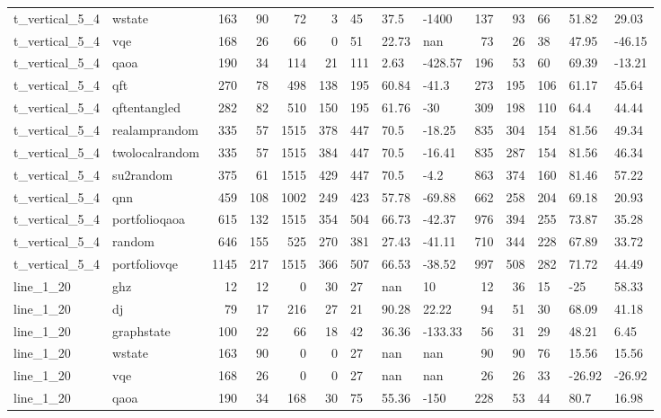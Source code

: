 \begin{longtable}{llrrrrlllrrlll}
t\_vertical\_5\_4 & wstate & 163 & 90 & 72 & 3 & 45 & 37.5 & -1400 & 137 & 93 & 66 & 51.82 & 29.03 \\
t\_vertical\_5\_4 & vqe & 168 & 26 & 66 & 0 & 51 & 22.73 & nan & 73 & 26 & 38 & 47.95 & -46.15 \\
t\_vertical\_5\_4 & qaoa & 190 & 34 & 114 & 21 & 111 & 2.63 & -428.57 & 196 & 53 & 60 & 69.39 & -13.21 \\
t\_vertical\_5\_4 & qft & 270 & 78 & 498 & 138 & 195 & 60.84 & -41.3 & 273 & 195 & 106 & 61.17 & 45.64 \\
t\_vertical\_5\_4 & qftentangled & 282 & 82 & 510 & 150 & 195 & 61.76 & -30 & 309 & 198 & 110 & 64.4 & 44.44 \\
t\_vertical\_5\_4 & realamprandom & 335 & 57 & 1515 & 378 & 447 & 70.5 & -18.25 & 835 & 304 & 154 & 81.56 & 49.34 \\
t\_vertical\_5\_4 & twolocalrandom & 335 & 57 & 1515 & 384 & 447 & 70.5 & -16.41 & 835 & 287 & 154 & 81.56 & 46.34 \\
t\_vertical\_5\_4 & su2random & 375 & 61 & 1515 & 429 & 447 & 70.5 & -4.2 & 863 & 374 & 160 & 81.46 & 57.22 \\
t\_vertical\_5\_4 & qnn & 459 & 108 & 1002 & 249 & 423 & 57.78 & -69.88 & 662 & 258 & 204 & 69.18 & 20.93 \\
t\_vertical\_5\_4 & portfolioqaoa & 615 & 132 & 1515 & 354 & 504 & 66.73 & -42.37 & 976 & 394 & 255 & 73.87 & 35.28 \\
t\_vertical\_5\_4 & random & 646 & 155 & 525 & 270 & 381 & 27.43 & -41.11 & 710 & 344 & 228 & 67.89 & 33.72 \\
t\_vertical\_5\_4 & portfoliovqe & 1145 & 217 & 1515 & 366 & 507 & 66.53 & -38.52 & 997 & 508 & 282 & 71.72 & 44.49 \\
line\_1\_20 & ghz & 12 & 12 & 0 & 30 & 27 & nan & 10 & 12 & 36 & 15 & -25 & 58.33 \\
line\_1\_20 & dj & 79 & 17 & 216 & 27 & 21 & 90.28 & 22.22 & 94 & 51 & 30 & 68.09 & 41.18 \\
line\_1\_20 & graphstate & 100 & 22 & 66 & 18 & 42 & 36.36 & -133.33 & 56 & 31 & 29 & 48.21 & 6.45 \\
line\_1\_20 & wstate & 163 & 90 & 0 & 0 & 27 & nan & nan & 90 & 90 & 76 & 15.56 & 15.56 \\
line\_1\_20 & vqe & 168 & 26 & 0 & 0 & 27 & nan & nan & 26 & 26 & 33 & -26.92 & -26.92 \\
line\_1\_20 & qaoa & 190 & 34 & 168 & 30 & 75 & 55.36 & -150 & 228 & 53 & 44 & 80.7 & 16.98 \\

\end{longtable}
